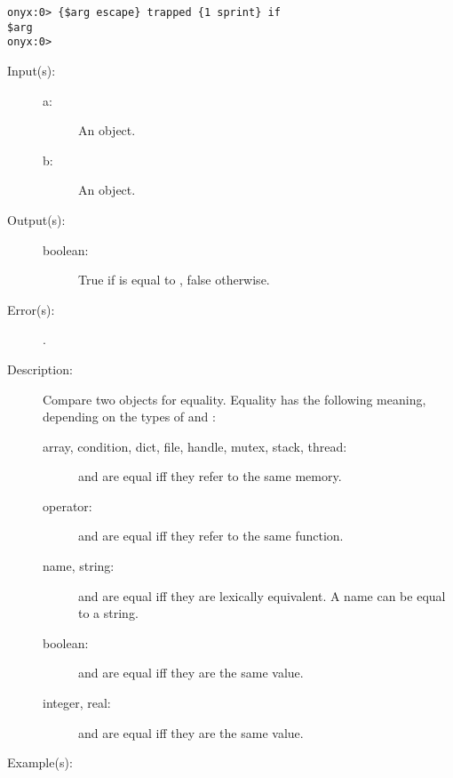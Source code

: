 \begin{description}
\begin{description}
\begin{verbatim}
onyx:0> {$arg escape} trapped {1 sprint} if
$arg
onyx:0>
		\end{verbatim}
	\end{description}
\label{systemdict:eq}
\item[{\onyxop{a b}{eq}{boolean}}: ]
	\begin{description}\item[]
	\item[Input(s): ]
		\begin{description}\item[]
		\item[a: ]
			An object.
		\item[b: ]
			An object.
		\end{description}
	\item[Output(s): ]
		\begin{description}\item[]
		\item[boolean: ]
			True if  is equal to , false
			otherwise.
		\end{description}
	\item[Error(s): ]
		\begin{description}\item[]
		\item[.]
		\end{description}
	\item[Description: ]
		Compare two objects for equality.  Equality has the following
		meaning, depending on the types of  and :
		\begin{description}
		\item[array, condition, dict, file, handle, mutex, stack,
		thread: ]  and  are equal iff they refer to
		the same memory.
		\item[operator: ]  and  are equal iff they
		refer to the same function.
		\item[name, string: ]  and  are equal iff they
		are lexically equivalent.  A name can be equal to a string.
		\item[boolean: ]  and  are equal iff they
		are the same value.
		\item[integer, real: ]  and  are equal iff
		they are the same value.
		\end{description}
	\item[Example(s): ]\begin{verbatim}


\end{verbatim}
\end{description}
\end{description}
